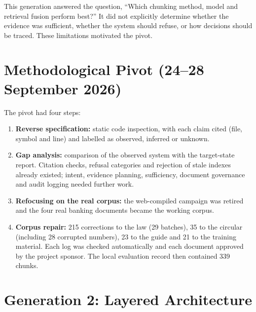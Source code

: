 \documentclass[a4paper,12pt,openany]{report}
\begin{document}
This generation answered the question, “Which chunking method, model and retrieval fusion perform
best?” It did not explicitly determine whether the evidence was sufficient, whether the system
should refuse, or how decisions should be traced. These limitations motivated the pivot.

\section{Methodological Pivot (24--28 September 2026)}
The pivot had four steps:
\begin{enumerate}
  \item \textbf{Reverse specification:} static code inspection, with each claim cited (file,
symbol and line) and labelled as observed, inferred or unknown.
  \item \textbf{Gap analysis:} comparison of the observed system with the target-state report.
Citation checks, refusal categories and rejection of stale indexes already existed; intent,
evidence planning, sufficiency, document governance and audit logging needed further work.
  \item \textbf{Refocusing on the real corpus:} the web-compiled campaign was retired and the four
real banking documents became the working corpus.
  \item \textbf{Corpus repair:} 215 corrections to the law (29 batches), 35 to the circular
(including 28 corrupted numbers), 23 to the guide and 21 to the training material. Each log was
checked automatically and each document approved by the project sponsor. The local evaluation
record then contained 339 chunks.
\end{enumerate}

\section{Generation 2: Layered Architecture}
\end{document}
